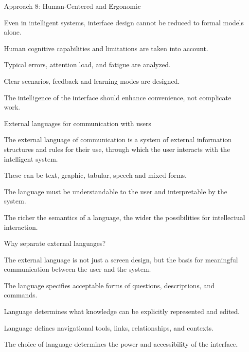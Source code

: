 \begin{frame}{Approach 8: Human-Centered and Ergonomic}
	\topline
	\justifying
	
	Even in intelligent systems, interface design cannot be reduced to formal models alone.
	
	\begin{textitemize}
		\item Human cognitive capabilities and limitations are taken into account.
		\item Typical errors, attention load, and fatigue are analyzed.
		\item Clear scenarios, feedback and learning modes are designed.
		\item The intelligence of the interface should enhance convenience, not complicate work.
	\end{textitemize}
\end{frame}

\begin{frame}{External languages for communication with users}
	\topline
	\justifying
	
	The external language of communication is a system of external information structures and rules for their use, through which the user interacts with the intelligent system.
	
	\begin{textitemize}
		\item These can be text, graphic, tabular, speech and mixed forms.
		\item The language must be understandable to the user and interpretable by the system.
		\item The richer the semantics of a language, the wider the possibilities for intellectual interaction.
	\end{textitemize}
\end{frame}

\begin{frame}{Why separate external languages?}
	\topline
	\justifying
	
	The external language is not just a screen design, but the basis for meaningful communication between the user and the system.
	
	\begin{textitemize}
		\item The language specifies acceptable forms of questions, descriptions, and commands.
		\item Language determines what knowledge can be explicitly represented and edited.
		\item Language defines navigational tools, links, relationships, and contexts.
		\item The choice of language determines the power and accessibility of the interface.
	\end{textitemize}
\end{frame}

